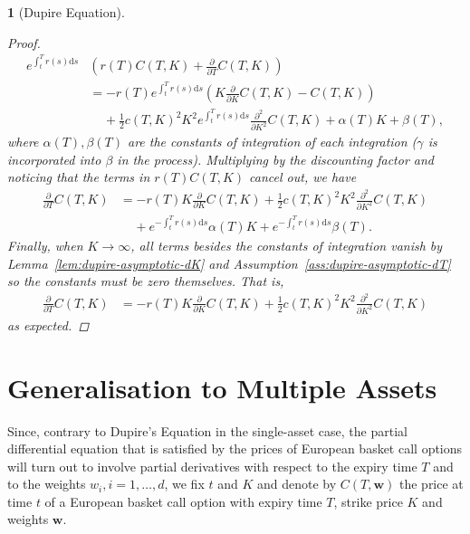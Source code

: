 \documentclass[english]{article}
\numberwithin{equation}{section}
\numberwithin{figure}{section}
\theoremstyle{bolddescit}
\newtheorem{theorem}{\protect\theoremname}[section]
\theoremstyle{definition}
\theoremstyle{definition}
\theoremstyle{plain}
\theoremstyle{plain}
\theoremstyle{bolddesc}
\theoremstyle{plain}
\theoremstyle{remark}
\providecommand{\theoremname}{Theorem}
\begin{document}
\begin{theorem}[Dupire Equation]
\begin{proof}
    \begin{align*}
      e^{\int_t^T r(s) \mathrm{d}s} &\left(r(T) C(T,K) + \frac{\partial}{\partial T}C(T,K)\right)\\
      &= - r(T) e^{\int_t^T r(s) \mathrm{d}s} \left( K \frac{\partial}{\partial K} C(T,K) - C(T,K) \right)\\
        &\ \ \ \ \ + \frac{1}{2} c(T,K)^2 K^2 e^{\int_t^T r(s) \mathrm{d}s}\frac{\partial^2}{\partial K^2} C(T,K) + \alpha(T) K + \beta(T),
    \end{align*}
    where $\alpha(T), \beta(T)$ are the constants of integration of each integration ($\gamma$ is incorporated into $\beta$ in the process). Multiplying by the discounting factor and noticing that the terms in $r(T)C(T,K)$ cancel out, we have
    \begin{align*}
      \frac{\partial}{\partial T}C(T,K)
      &= - r(T) K \frac{\partial}{\partial K} C(T,K)
        + \frac{1}{2} c(T,K)^2 K^2 \frac{\partial^2}{\partial K^2} C(T,K)\\
        &\ \ \ \ \ + e^{-\int_t^T r(s)\mathrm{d}s}\alpha(T) K + e^{-\int_t^T r(s)\mathrm{d}s}\beta(T).
    \end{align*}
    Finally, when $K \to \infty$, all terms besides the constants of integration vanish by Lemma~\ref{lem:dupire-asymptotic-dK} and Assumption~\ref{ass:dupire-asymptotic-dT} so the constants must be zero themselves. That is,
    \begin{align*}
      \frac{\partial}{\partial T}C(T,K)
      &= - r(T) K \frac{\partial}{\partial K} C(T,K)
        + \frac{1}{2} c(T,K)^2 K^2 \frac{\partial^2}{\partial K^2} C(T,K)
    \end{align*}
    as expected.
  \end{proof}
\end{theorem}

\section{Generalisation to Multiple Assets}\label{sec:generalisation}


Since, contrary to Dupire's Equation in the single-asset case, the partial differential equation that is satisfied by the prices of European basket call options will turn out to involve partial derivatives with respect to the expiry time $T$ and to the weights $w_i, i=1,\ldots,d$, we fix $t$ and $K$ and denote by $C(T,\mathbf{w})$ the price at time $t$ of a European basket call option with expiry time $T$, strike price $K$ and weights $\mathbf{w}$.
\end{document}
